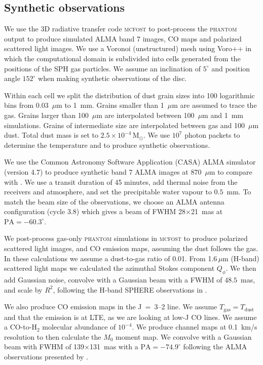 \documentclass[usenatbib,a4paper,times]{mnras}
\renewcommand{\sun}{\mathrm{M}_{\odot}}
\newcommand{\mcfost}{\textsc{mcfost}}
\renewcommand{\phantom}{\textsc{phantom}}
\begin{document}
\subsection{Synthetic observations}

We use the 3D radiative transfer code \mcfost{} \citep{pinte:2006, pinte:2009}
to post-process the \phantom{} output to produce simulated ALMA band 7 images,
CO maps and polarized scattered light images. We use a Voronoi (unstructured)
mesh using Voro++ \citep{rycroft:2009} in which the computational domain is
subdivided into cells generated from the positions of the SPH gas particles. We
assume an inclination of $5^{\circ}$ and position angle $152^{\circ}$
\citep{huang:2018} when making synthetic observations of the disc.

Within each cell we split the distribution of dust grain sizes into 100
logarithmic bins from 0.03~$\mu$m to 1~mm. Grains smaller than 1~$\mu$m are
assumed to trace the gas. Grains larger than 100~$\mu$m are interpolated between
100~$\mu$m and 1~mm simulations. Grains of intermediate size are interpolated
between gas and 100~$\mu$m dust. Total dust mass is set to $2.5\times
10^{-4}\,\sun{}$. We use $10^7$ photon packets to determine the temperature and
to produce synthetic observations.

We use the Common Astronomy Software Application (CASA) ALMA simulator (version
4.7) to produce synthetic band 7 ALMA images at 870~$\mu$m to compare with
\citet{andrews:2016}. We use a transit duration of 45 minutes, add thermal noise
from the receivers and atmosphere, and set the precipitable water vapour to
$0.5$~mm. To match the beam size of the observations, we choose an ALMA antenna
configuration (cycle 3.8) which gives a beam of FWHM 28$\times$21~mas at
$\mathrm{PA}=-60.3^{\circ}$.

We post-process gas-only \phantom{} simulations in \mcfost{} to produce
polarized scattered light images, and CO emission maps, assuming the dust
follows the gas. In these calculations we assume a dust-to-gas ratio of 0.01.
From 1.6$\,\mu$m (H-band) scattered light maps we calculated the azimuthal
Stokes component $Q_{\phi}$. We then add Gaussian noise, convolve with a
Gaussian beam with a FWHM of $48.5$~mas, and scale by $R^2$, following the
H-band SPHERE observations in \citet{van-boekel:2017}.

We also produce CO emission maps in the J~=~3--2 line. We assume
$T_{\mathrm{gas}} = T_{\mathrm{dust}}$ and that the emission is at LTE, as we
are looking at low-J CO lines. We assume a CO-to-H${}_2$ molecular abundance of
$10^{-4}$. We produce channel maps at 0.1~km/s resolution to then calculate the
$M_0$ moment map. We convolve with a Gaussian beam with FWHM of
139$\times$131~mas with a $\mathrm{PA}=-74.9^{\circ}$ following the ALMA
observations presented by \citet{huang:2018}.
\end{document}

